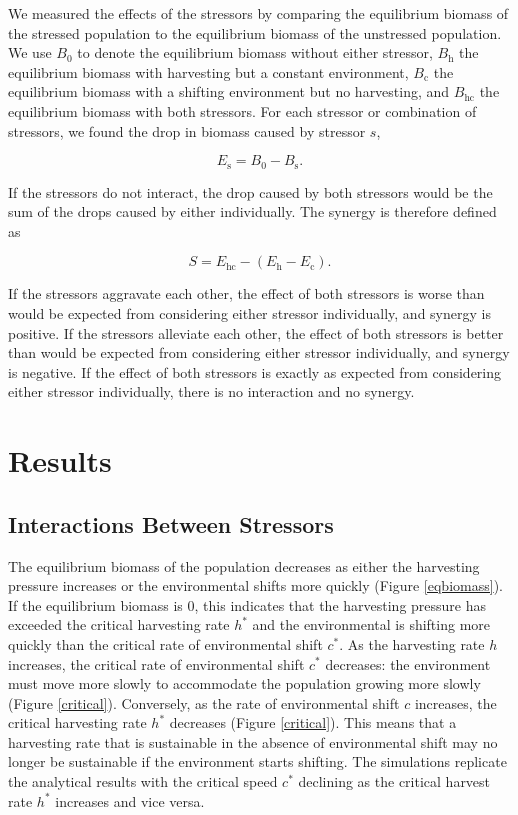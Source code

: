 \documentclass[]{article}
\begin{document}
We measured the effects of the stressors by comparing the equilibrium biomass of the stressed population to 
the equilibrium biomass of the unstressed population. We use $B_0$ to denote the equilibrium biomass 
without either stressor, $B_\text{h}$ the equilibrium biomass with harvesting but a constant environment, $B_\text{c}$ the 
equilibrium biomass with a shifting environment but no harvesting, and $B_\text{hc}$ the equilibrium biomass with 
both stressors. For each stressor or combination of stressors, we found the drop in  biomass caused 
by stressor $s$,

\[E_\text{s}=B_0-B_\text{s}.\]

\noindent If the stressors do not interact, the drop caused by both stressors would be the sum of the drops caused by 
either individually. The synergy is therefore defined as

\[S = E_\text{hc}-\left(E_\text{h}-E_\text{c}\right).\]

\noindent If the stressors aggravate each other, the effect of both stressors is worse than would be expected from 
considering either stressor individually, and synergy is positive. If the stressors alleviate each other, the effect 
of both stressors is better than would be expected from considering either stressor individually, and synergy is 
negative. If the effect of both stressors is exactly as expected from considering either stressor individually, 
there is no interaction and no synergy.

\section{Results}

\subsection{Interactions Between Stressors }

The equilibrium biomass of the population decreases as either the harvesting pressure 
increases or the environmental shifts more quickly (Figure \ref{eqbiomass}). If the equilibrium biomass is $0$, this 
indicates that the harvesting pressure has exceeded the critical harvesting rate $h^*$ and the environmental 
is shifting more quickly than the critical rate of environmental shift $c^*$. As the harvesting rate $h$ increases, 
the critical rate of environmental shift $c^*$ decreases: the environment must move more slowly to 
accommodate the population growing more slowly (Figure \ref{critical}). Conversely, as the rate of 
environmental shift $c$ increases, the critical harvesting rate $h^*$ decreases (Figure  \ref{critical}). This 
means that a harvesting rate that is sustainable in the absence of environmental shift may no longer be sustainable if 
the environment starts shifting. The simulations replicate the analytical results with the critical speed $c^*$ 
declining as the critical harvest rate $h^*$ increases and vice versa.
\end{document}
